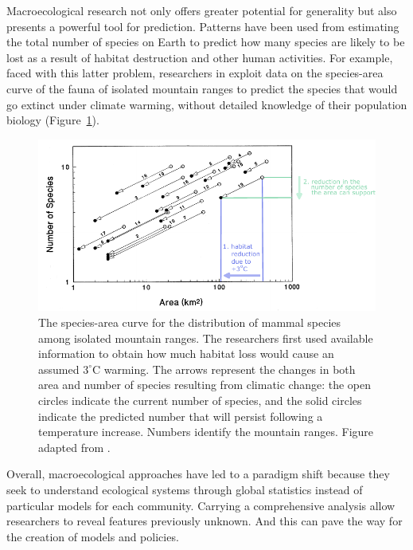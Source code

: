 Macroecological research not only offers greater potential for generality but also presents a powerful tool for prediction. Patterns have been used from estimating the total number of species on Earth \cite{mora2011many} to predict how many species are likely to be lost as a result of habitat destruction and other human activities. For example, faced with this latter problem, researchers in exploit data on the species-area curve of the fauna of isolated mountain ranges to predict the species that would go extinct under climate warming, without detailed knowledge of their population biology \cite{mcdonald1992using} (Figure~\ref{chp:methods:fig:exmacro}).\\

\begin{figure}[t]
     \centering
\includegraphics[width=\columnwidth]{figures/methods/fig_ex_macro.pdf}
 \caption[The macroecological approach]{The species-area curve for the distribution of mammal species among isolated mountain ranges. The researchers first used available information to obtain how much habitat loss would cause an assumed $3^{\circ}$C warming.
The arrows represent the changes in both area and number of species resulting from climatic change: the  open circles indicate the current number of species, and the solid circles indicate the predicted number that will persist following a temperature increase. Numbers identify the mountain ranges. Figure adapted from \cite{brown1995macroecology}.}
\label{chp:methods:fig:exmacro}
\end{figure}

Overall, macroecological approaches have led to a paradigm shift because they seek to understand ecological systems through global statistics instead of particular models for each community. Carrying a comprehensive analysis allow researchers to reveal features previously unknown. And this can pave the way for the creation of models and policies.

